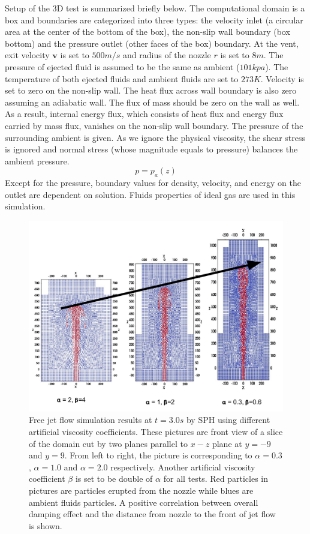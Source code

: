 Setup of the 3D test is summarized briefly below. The computational domain is a box and boundaries are categorized into three types: the velocity inlet (a circular area at the center of the bottom of the box), the non-slip wall boundary (box bottom) and the pressure outlet (other faces of the box) boundary. At the vent, exit velocity $\textbf{v}$ is set to $500 m / s$ and radius of the nozzle $r$ is set to $8m $. The pressure of ejected fluid is assumed to be the same as ambient ($101 kpa$). The temperature of both ejected fluids and ambient fluids are set to $273 K$. 
Velocity is set to zero on the non-slip wall. The heat flux across wall boundary is also zero assuming an adiabatic wall. The flux of mass should be zero on the wall as well. As a result, internal energy flux, which consists of heat flux and energy flux carried by mass flux, vanishes on the non-slip wall boundary. 
The pressure of the surrounding ambient is given. As we ignore the physical viscosity, the shear stress is ignored and normal stress (whose magnitude equals to pressure) balances the ambient pressure.
\begin{equation}
p = p_a\left(z\right)  \label{eq:pressure_bc_p} 
\end{equation} 
Except for the pressure, boundary values for density, velocity, and energy on the outlet are dependent on solution. Fluids properties of ideal gas are used in this simulation.

\begin{figure}[H]
   \centering
   \includegraphics[width=0.95 \textwidth]{./Figures/SPH-3D-jet}
   \caption{Free jet flow simulation results at $t=3.0 s$ by SPH using different artificial viscosity coefficients. These pictures are front view of a slice of the domain cut by two planes parallel to $x-z$ plane at $y=-9$ and $y=9$. From left to right, the picture is corresponding to $\alpha=0.3$, $\alpha=1.0$ and $\alpha=2.0$ respectively. Another artificial viscosity coefficient $\beta$ is set to be double of $\alpha$ for all tests. Red particles in pictures are particles erupted from the nozzle while blues are ambient fluids particles. A positive correlation between overall damping effect and the distance from nozzle to the front of jet flow is shown.}
    \label{fig:free-jet-SPH-comparison}
\end{figure}


